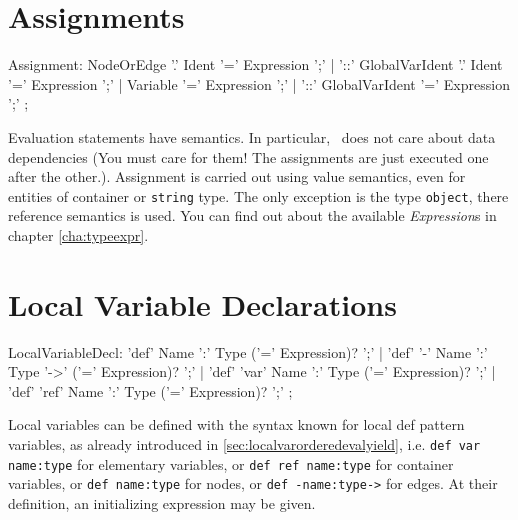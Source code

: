 \section{Assignments} \label{sub:assignments}

\begin{rail}
  Assignment:
	  NodeOrEdge '.' Ident '=' Expression ';' |
	  '::' GlobalVarIdent '.' Ident '=' Expression ';' |
	  Variable '=' Expression ';' |
	  '::' GlobalVarIdent '=' Expression ';'
	;
\end{rail}

Evaluation statements have  semantics.
In particular, \GrG\ does not care about data dependencies (You must care for them! The assignments are just executed one after the other.).
Assignment is carried out using value semantics, even for entities of container or \texttt{string} type.
The only exception is the type \texttt{object}, there reference semantics is used.
You can find out about the available \emph{Expression}s in chapter \ref{cha:typeexpr}.


\section{Local Variable Declarations} 

\begin{rail} 
  LocalVariableDecl: 
	'def' Name ':' Type ('=' Expression)? ';' |
	'def' '-' Name ':' Type '->' ('=' Expression)? ';' |
	'def' 'var' Name ':' Type ('=' Expression)? ';' |
	'def' 'ref' Name ':' Type ('=' Expression)? ';'
	;
\end{rail}

Local variables can be defined with the syntax known for local def pattern variables, as already introduced in \ref{sec:localvarorderedevalyield}, i.e. \texttt{def var name:type} for elementary variables, or \texttt{def ref name:type} for container variables, or \texttt{def name:type} for nodes, or \texttt{def -name:type->} for edges.
At their definition, an initializing expression may be given.



